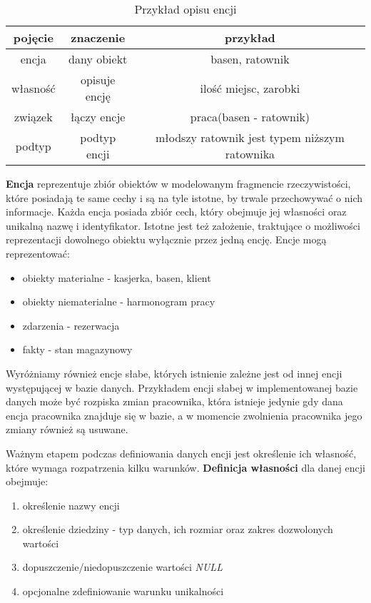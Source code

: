 \documentclass[a4paper]{article}
\begin{document}
\begin{table}[htbp]
\centering
\begin{tabular}{|c|c|c|}
\hline
\textbf{pojęcie} & \textbf{znaczenie} & \textbf{przykład}                             \\ \hline
encja            & dany obiekt        & basen, ratownik                               \\ \hline
własność         & opisuje encję      & ilość miejsc, zarobki                         \\ \hline
związek          & łączy encje        & praca(basen - ratownik)                       \\ \hline
podtyp           & podtyp encji       & młodszy ratownik jest typem niższym ratownika \\ \hline
\end{tabular}
\caption{Przykład opisu encji}
\end{table}

\textbf{Encja} reprezentuje  zbiór  obiektów  w  modelowanym  fragmencie  rzeczywistości, które posiadają te same cechy i są na tyle istotne, by trwale przechowywać o nich informacje. Każda encja posiada zbiór cech, który obejmuje jej własności oraz unikalną nazwę i identyfikator. Istotne jest też założenie, traktujące o możliwości reprezentacji dowolnego obiektu wyłącznie przez jedną encję. Encje mogą reprezentować:
\begin{itemize}
    \item obiekty materialne - kasjerka, basen, klient
    \item obiekty niematerialne - harmonogram pracy
    \item zdarzenia - rezerwacja
    \item fakty - stan magazynowy
\end{itemize}

Wyróżniamy również encje słabe, których istnienie zależne jest od innej encji występującej w bazie danych. Przykładem encji słabej w implementowanej bazie danych może być rozpiska zmian pracownika, która istnieje jedynie gdy dana encja pracownika znajduje się w bazie, a w momencie zwolnienia pracownika jego zmiany również są usuwane.

Ważnym etapem podczas definiowania danych encji jest określenie ich własność, które wymaga rozpatrzenia kilku warunków. \textbf{Definicja własności} dla danej encji obejmuje:
\begin{enumerate}
    \setlength\itemsep{0.1em}
    \item określenie nazwy encji
    \item określenie dziedziny - typ danych, ich rozmiar oraz zakres dozwolonych wartości
    \item dopuszczenie/niedopuszczenie wartości \textit{NULL}
    \item opcjonalne zdefiniowanie warunku unikalności
\end{enumerate}
\end{document}
